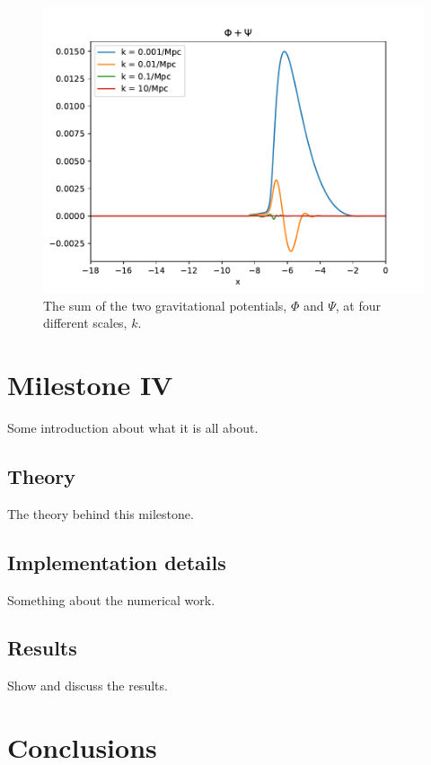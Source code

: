\documentclass{aa}
\begin{document}
\begin{figure}[h!]
   \includegraphics[scale=0.6]{../figures/milestone3/phi_psi.pdf}
   \caption{The sum of the two gravitational potentials, $\Phi$ and $\Psi$, at four different scales, $k$.}\label{fig:phi_psi}
\end{figure}



\section{Milestone IV}
Some introduction about what it is all about.

\subsection{Theory}
The theory behind this milestone.

\subsection{Implementation details}
Something about the numerical work.

\subsection{Results}
Show and discuss the results.

\section{Conclusions}
\end{document}
